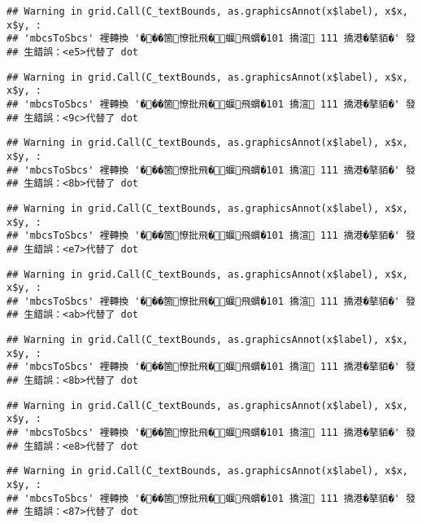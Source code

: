 \documentclass[
]{article}
\begin{document}
\begin{verbatim}
## Warning in grid.Call(C_textBounds, as.graphicsAnnot(x$label), x$x, x$y, :
## 'mbcsToSbcs' 裡轉換 '���箇憭批飛�蝘飛蝟�101 撟渲 111 撟港�摮貊�' 發
## 生錯誤：<e5>代替了 dot
\end{verbatim}

\begin{verbatim}
## Warning in grid.Call(C_textBounds, as.graphicsAnnot(x$label), x$x, x$y, :
## 'mbcsToSbcs' 裡轉換 '���箇憭批飛�蝘飛蝟�101 撟渲 111 撟港�摮貊�' 發
## 生錯誤：<9c>代替了 dot
\end{verbatim}

\begin{verbatim}
## Warning in grid.Call(C_textBounds, as.graphicsAnnot(x$label), x$x, x$y, :
## 'mbcsToSbcs' 裡轉換 '���箇憭批飛�蝘飛蝟�101 撟渲 111 撟港�摮貊�' 發
## 生錯誤：<8b>代替了 dot
\end{verbatim}

\begin{verbatim}
## Warning in grid.Call(C_textBounds, as.graphicsAnnot(x$label), x$x, x$y, :
## 'mbcsToSbcs' 裡轉換 '���箇憭批飛�蝘飛蝟�101 撟渲 111 撟港�摮貊�' 發
## 生錯誤：<e7>代替了 dot
\end{verbatim}

\begin{verbatim}
## Warning in grid.Call(C_textBounds, as.graphicsAnnot(x$label), x$x, x$y, :
## 'mbcsToSbcs' 裡轉換 '���箇憭批飛�蝘飛蝟�101 撟渲 111 撟港�摮貊�' 發
## 生錯誤：<ab>代替了 dot
\end{verbatim}

\begin{verbatim}
## Warning in grid.Call(C_textBounds, as.graphicsAnnot(x$label), x$x, x$y, :
## 'mbcsToSbcs' 裡轉換 '���箇憭批飛�蝘飛蝟�101 撟渲 111 撟港�摮貊�' 發
## 生錯誤：<8b>代替了 dot
\end{verbatim}

\begin{verbatim}
## Warning in grid.Call(C_textBounds, as.graphicsAnnot(x$label), x$x, x$y, :
## 'mbcsToSbcs' 裡轉換 '���箇憭批飛�蝘飛蝟�101 撟渲 111 撟港�摮貊�' 發
## 生錯誤：<e8>代替了 dot
\end{verbatim}

\begin{verbatim}
## Warning in grid.Call(C_textBounds, as.graphicsAnnot(x$label), x$x, x$y, :
## 'mbcsToSbcs' 裡轉換 '���箇憭批飛�蝘飛蝟�101 撟渲 111 撟港�摮貊�' 發
## 生錯誤：<87>代替了 dot
\end{verbatim}
\end{document}

